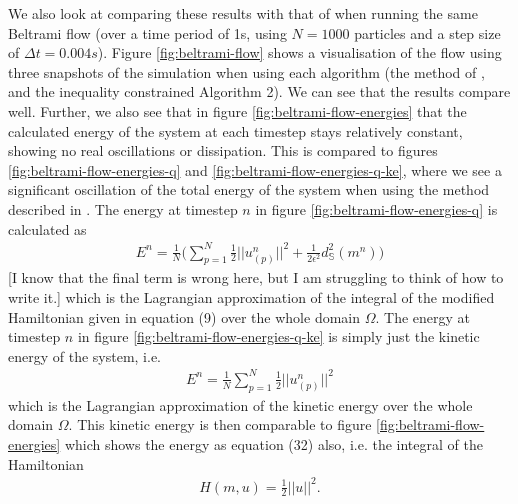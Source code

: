 \documentclass[11pt, oneside]{article}   	%
\newcommand{\dt}{\Delta t}
\newcommand{\Sb}{\mathbb{S}}
\begin{document}
We also look at comparing these results with that of \cite{gallouet2016lagrangian} when running the same Beltrami flow (over a time period of 1s, using \(N = 1000\) particles and a step size of \(\dt = 0.004s\)). Figure \ref{fig:beltrami-flow} shows a visualisation of the flow using three snapshots of the simulation when using each algorithm (the method of \cite{gallouet2016lagrangian}, and the inequality constrained Algorithm 2). We can see that the results compare well. Further, we also see that in figure \ref{fig:beltrami-flow-energies} that the calculated energy of the system at each timestep stays relatively constant, showing no real oscillations or dissipation. This is compared to figures \ref{fig:beltrami-flow-energies-q} and \ref{fig:beltrami-flow-energies-q-ke}, where we see a significant oscillation of the total energy of the system when using the method described in \cite{gallouet2016lagrangian}. The energy at timestep \(n\) in figure \ref{fig:beltrami-flow-energies-q} is calculated as
\begin{align}
E^n = \frac{1}{N} \Big( \sum_{p = 1}^{N} \frac{1}{2} || u^n_{(p)} ||^2 + \frac{1}{2 \epsilon^2} d^2_{\Sb}(m^n) \Big) 
\end{align} 
[I know that the final term is wrong here, but I am struggling to think of how to write it.]
which is the Lagrangian approximation of the integral of the modified Hamiltonian given in equation (9) over the whole domain \(\Omega\). The energy at timestep \(n\) in figure \ref{fig:beltrami-flow-energies-q-ke} is simply just the kinetic energy of the system, i.e.
\begin{align}
E^n = \frac{1}{N} \sum_{p = 1}^{N} \frac{1}{2} || u^n_{(p)} ||^2
\end{align} 
which is the Lagrangian approximation of the kinetic energy over the whole domain \(\Omega\). This kinetic energy is then comparable to figure \ref{fig:beltrami-flow-energies} which shows the energy as equation (32) also, i.e. the integral of the Hamiltonian
\begin{align}
H(m, u) = \frac{1}{2} || u ||^2.
\end{align}
\end{document}
